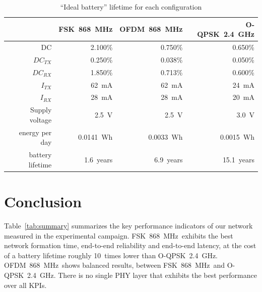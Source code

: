 \documentclass[sensors,article,submit,moreauthors,pdftex]{Definitions/mdpi}
\newcommand{\fsk}           {FSK~868~MHz}
\newcommand{\oqpsk}         {O-QPSK~2.4~GHz}
\newcommand{\ofdm}          {OFDM~868~MHz}
\begin{document}
\begin{table}
    \centering
    \begin{tabular}{|r|r|r|r|}
    \hline
                          &      \fsk &     \ofdm &     \oqpsk \\ \hline
        DC                &   2.100\% &   0.750\% &    0.650\% \\ \hline
        $DC_{TX}$         &   0.250\% &   0.038\% &    0.050\% \\ \hline
        $DC_{RX}$         &   1.850\% &   0.713\% &    0.600\% \\ \hline
        $I_{TX}$          &     62~mA &     62~mA &      24~mA \\ \hline
        $I_{RX}$          &     28~mA &     28~mA &      20~mA \\ \hline
        Supply voltage    &     2.5~V &     2.5~V &      3.0~V \\ \hline
        energy per day    & 0.0141~Wh & 0.0033~Wh &  0.0015~Wh \\ \hline
        battery lifetime  & 1.6~years & 6.9~years & 15.1~years \\ \hline
        \end{tabular}
    \caption{``Ideal battery'' lifetime for each configuration}
    \label{tab:energy_table}
\end{table}

\section{Conclusion}
\label{sec:conclusion}


Table~\ref{tab:summary} summarizes the key performance indicators of our network measured in the experimental campaign.
\fsk\ exhibits the best network formation time, end-to-end reliability and end-to-end latency,
    at the cost of a battery lifetime roughly 10~times lower than \oqpsk.
\ofdm\ shows balanced results, between \fsk\ and \oqpsk.
There is no single PHY layer that exhibits the best performance over all KPIs.
\end{document}
